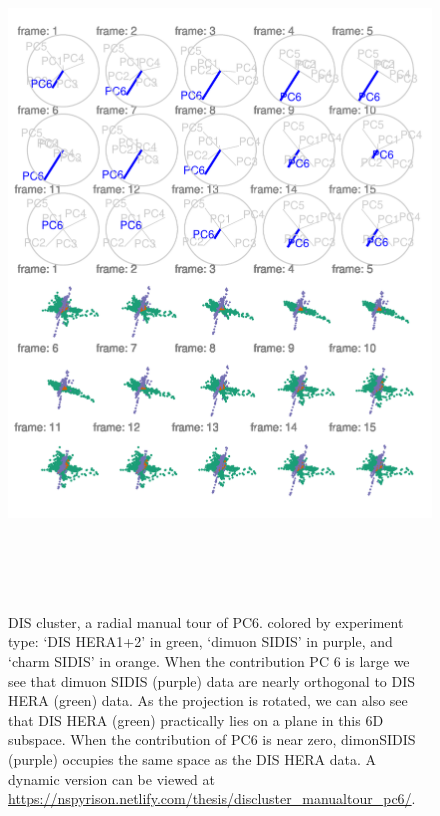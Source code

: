 \documentclass{monashthesis}
\theoremstyle{definition}
\theoremstyle{definition}
\theoremstyle{definition}
\theoremstyle{remark}
\begin{document}
\begin{figure}

{\centering \includegraphics[width=6in,height=7.2in]{./figures/DISclusterGood} 

}

\caption{DIS cluster, a radial manual tour of PC6.
colored by experiment type: `DIS HERA1+2' in green, `dimuon SIDIS' in
purple, and `charm SIDIS' in orange. When the contribution PC 6 is large
we see that dimuon SIDIS (purple) data are nearly orthogonal to DIS HERA
(green) data. As the projection is rotated, we can also see that DIS
HERA (green) practically lies on a plane in this 6D subspace. When the
contribution of PC6 is near zero, dimonSIDIS (purple) occupies the same
space as the DIS HERA data. A dynamic version can be viewed at
\url{https://nspyrison.netlify.com/thesis/discluster_manualtour_pc6/}.}\label{fig:DISclusterGood}
\end{figure}
\end{document}
